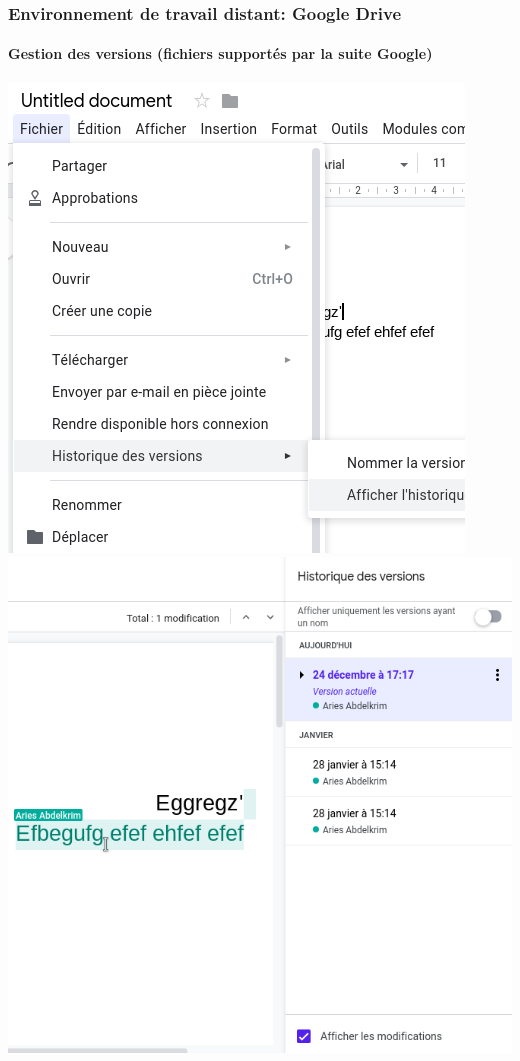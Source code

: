\documentclass{beamer}
\begin{document}
\begin{frame}
\frametitle{Environnement de travail distant: Google Drive}
\framesubtitle{Gestion des versions (fichiers supportés par la suite Google) }

\begin{center}
	\includegraphics[width=
	.45\textwidth]{../img/Bweb01-environnement/drive-versionB1.png}
	\vline
	\includegraphics[width=
	.45\textwidth]{../img/Bweb01-environnement/drive-versionB2.png}
\end{center}

\end{frame}
\end{document}
